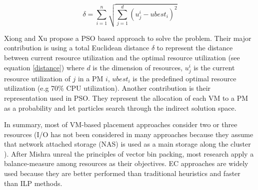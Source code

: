 \begin{equation} \label{distance}
	\delta = \sum_{i=1}^n \sqrt{\sum_{j=1}^d (u_j^i - ubest_i)^2}
\end{equation}

Xiong and Xu \cite{Xiong:2014jq} propose a PSO based approach to solve the problem. Their major contribution is using a total Euclidean distance $\delta$ to represent the distance between current resource utilization and the optimal resource utilization (see equation \ref{distance}) where $d$ is the dimension of resources, $u_j^i$ is the current resource utilization of $j$ in a PM $i$, $ubest_i$ is the predefined optimal resource utilization (e.g 70\% CPU utilization). Another contribution is their representation used in PSO. They represent the allocation of each VM to a PM as a probability and let particles search through the indirect solution space.

In summary, most of VM-based placement approaches consider two or three resources (I/O has not been considered in many approaches because they assume that network attached storage (NAS) is used as a main storage along the cluster \cite{Murtazaev:2014eo}). After Mishra unreal the principles of vector bin packing, most research apply a balance-measure among resources as their objectives. EC approaches are widely used because they are better performed than traditional heuristics and faster than ILP methods.







